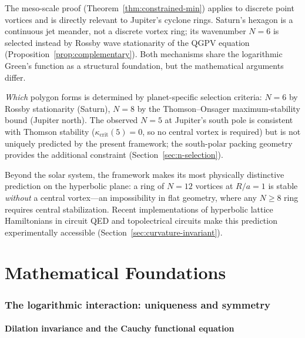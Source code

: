 \documentclass[12pt, a4paper]{article}
\numberwithin{equation}{section}
\begin{document}
The meso-scale proof (Theorem~\ref{thm:constrained-min}) applies to
discrete point vortices and is directly relevant to Jupiter's cyclone
rings.  Saturn's hexagon is a continuous jet meander, not a discrete
vortex ring; its wavenumber $N = 6$ is selected instead by Rossby
wave stationarity of the QGPV equation
(Proposition~\ref{prop:complementary}).  Both mechanisms share the
logarithmic Green's function as a structural foundation, but the
mathematical arguments differ.

\emph{Which} polygon forms is determined by planet-specific selection
criteria: $N = 6$ by Rossby stationarity (Saturn), $N = 8$ by the
Thomson--Onsager maximum-stability bound (Jupiter north).  The observed
$N = 5$ at Jupiter's south pole is consistent with Thomson stability
($\kappa_{\mathrm{crit}}(5) = 0$, so no central vortex is required)
but is not uniquely predicted by the present framework; the south-polar
packing geometry provides the additional constraint
(Section~\ref{sec:n-selection}).

Beyond the solar system, the framework makes its most physically
distinctive prediction on the hyperbolic plane: a ring of $N = 12$
vortices at $R/a = 1$ is stable \emph{without} a central vortex---an
impossibility in flat geometry, where any $N \ge 8$ ring requires
central stabilization.  Recent implementations of hyperbolic lattice
Hamiltonians in circuit QED \citep{Kollar2019} and topolectrical
circuits \citep{Lenggenhager2022} make this prediction experimentally
accessible (Section~\ref{sec:curvature-invariant}).



\part{Mathematical Foundations}
\label{part:math}

\section{The logarithmic interaction: uniqueness and symmetry}
\label{sec:log-interaction}

\subsection{Dilation invariance and the Cauchy functional equation}
\label{sec:dilation-invariance}
\end{document}
